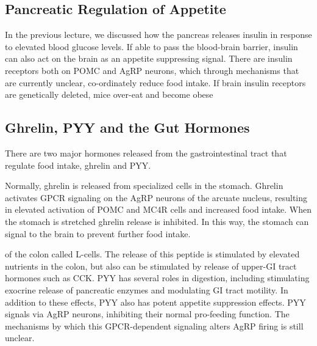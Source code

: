 \documentclass{tufte-handout}
\begin{document}
\subsection{Pancreatic Regulation of Appetite}

In the previous lecture, we discussed how the pancreas releases insulin in response to elevated blood glucose levels.  If able to pass the blood-brain barrier, insulin can also act on the brain as an appetite suppressing signal.  There are insulin receptors both on POMC and AgRP neurons, which through mechanisms that are currently unclear, co-ordinately reduce food intake. If brain insulin receptors are genetically deleted, mice over-eat and become obese\cite{Bruning2000} 

\subsection{Ghrelin, PYY and the Gut Hormones}

There are two major hormones released from the gastrointestinal tract that regulate food intake, ghrelin and  PYY.  

Normally, ghrelin is released from specialized cells in the stomach.   Ghrelin activates GPCR signaling on the AgRP neurons of the arcuate nucleus, resulting in elevated activation of POMC and MC4R cells and increased food intake.  When the stomach is stretched ghrelin release is inhibited.  In this way, the stomach can signal to the brain to prevent further food intake.

 of the colon called L-cells.  The release of this peptide is stimulated by elevated nutrients in the colon, but also can be stimulated by release of upper-GI tract hormones such as CCK.  PYY has several roles in digestion, including stimulating exocrine release of pancreatic enzymes and modulating GI tract motility.  In addition to these effects, PYY also has potent appetite suppression effects.  PYY signals via AgRP neurons, inhibiting their normal pro-feeding function.  The mechanisms by which this GPCR-dependent signaling alters AgRP firing is still unclear.
\end{document}
